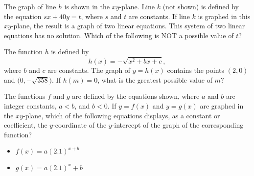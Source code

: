 The graph of line \(h\) is shown in the \(xy\)-plane. Line \(k\) (not shown) is defined by the equation \(sx + 40y = t\), where \(s\) and \(t\) are constants. If line \(k\) is graphed in this \(xy\)-plane, the result is a graph of two linear equations. This system of two linear equations has no solution. Which of the following is NOT a possible value of \(t\)?

\vspace{0.75em}


\vspace{2em}
\newpage

\noindent\markforreview
\vspace{1em}

The function \(h\) is defined by
\[
h(x) = -\sqrt{x^{2} + bx + c},
\]
where \(b\) and \(c\) are constants. The graph of \(y = h(x)\) contains the points \((2, 0)\) and \(\bigl(0, -\sqrt{358}\bigr)\). If \(h(m) = 0\), what is the greatest possible value of \(m\)?

\vspace{0.75em}


\vspace{2em}
\newpage

\noindent\markforreview
\vspace{1em}

The functions \(f\) and \(g\) are defined by the equations shown, where \(a\) and \(b\) are integer constants, \(a < b\), and \(b < 0\). If \(y = f(x)\) and \(y = g(x)\) are graphed in the \(xy\)-plane, which of the following equations displays, as a constant or coefficient, the \(y\)-coordinate of the \(y\)-intercept of the graph of the corresponding function?
\begin{itemize}
\item[I.] \(f(x) = a(2.1)^{x + b}\)
\item[II.] \(g(x) = a(2.1)^{x} + b\)
\end{itemize}

\vspace{0.75em}


\vspace{2em}
\newpage

